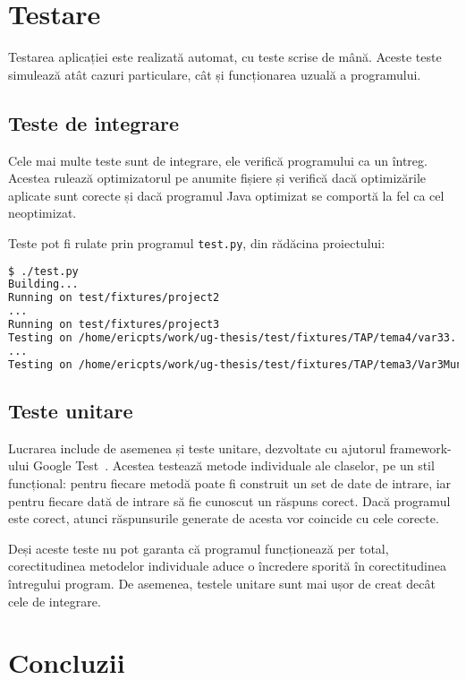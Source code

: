 \section{Testare}

Testarea aplicației este realizată automat, cu teste scrise de mână.
Aceste teste simulează atât cazuri particulare, cât și funcționarea uzuală a
programului.

\subsection{Teste de integrare}

Cele mai multe teste sunt de integrare, ele verifică programului ca un întreg.
Acestea rulează optimizatorul pe anumite fișiere și verifică dacă optimizările
aplicate sunt corecte și dacă programul Java optimizat se comportă la fel ca cel
neoptimizat.

Teste pot fi rulate prin programul \texttt{test.py}, din rădăcina proiectului:

\begin{lstlisting}[language=Bash]
$ ./test.py
Building...
Running on test/fixtures/project2
...
Running on test/fixtures/project3
Testing on /home/ericpts/work/ug-thesis/test/fixtures/TAP/tema4/var33...
...
Testing on /home/ericpts/work/ug-thesis/test/fixtures/TAP/tema3/Var3Munte...
\end{lstlisting}

\subsection{Teste unitare}

Lucrarea include de asemenea și teste unitare, dezvoltate cu ajutorul framework-ului Google
Test~\cite{google_test}.
Acestea testează metode individuale ale claselor, pe un stil funcțional: pentru
fiecare metodă poate fi construit un set de date de intrare, iar pentru fiecare
dată de intrare să fie cunoscut un răspuns corect. Dacă programul este corect,
atunci răspunsurile generate de acesta vor coincide cu cele corecte.

Deși aceste teste nu pot garanta că programul funcționează per total,
corectitudinea metodelor individuale aduce o încredere sporită în corectitudinea
întregului program. De asemenea, testele unitare sunt mai ușor de creat decât
cele de integrare.

\section{Concluzii}

